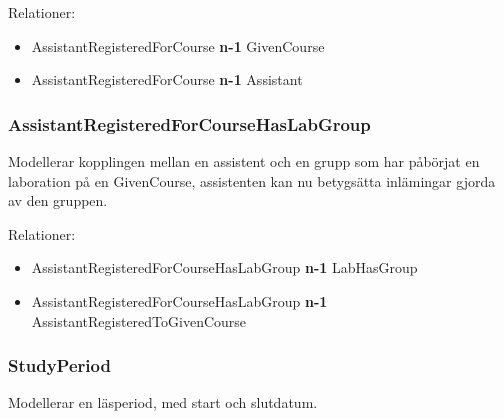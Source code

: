 Relationer: 
\begin{itemize}
  \item AssistantRegisteredForCourse {\bf n-1} GivenCourse 
  \item AssistantRegisteredForCourse {\bf n-1} Assistant 
\end{itemize}

\subsubsection{AssistantRegisteredForCourseHasLabGroup}
Modellerar kopplingen mellan en assistent och en grupp som har påbörjat en laboration på en GivenCourse, assistenten kan nu betygsätta inlämingar gjorda av den gruppen. 

Relationer: 
\begin{itemize}
  \item AssistantRegisteredForCourseHasLabGroup {\bf n-1} LabHasGroup 
  \item AssistantRegisteredForCourseHasLabGroup {\bf n-1} AssistantRegisteredToGivenCourse 
\end{itemize}

\subsubsection{StudyPeriod}
Modellerar en läsperiod, med start och slutdatum.
